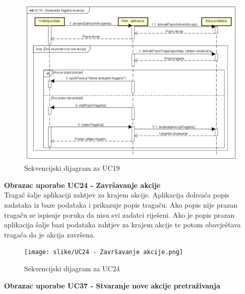				\begin{figure}[H]
					\includegraphics[scale=0.5]{slike/UC19 - Dodavanje tragača na akciju.png} %
					\centering
					\caption{Sekvencijski dijagram za UC19}
					\label{fig:UC19 - Dodavanje tragača na akciju}
				\end{figure}
	
				\eject

				\noindent
				\textbf{Obrazac uporabe UC24 - Završavanje akcije}\\

				\noindent
				Tragač šalje aplikaciji zahtjev za krajem akcije.
        				Aplikacija dohvaća popis zadataka iz baze podataka i prikazuje popis tragaču.
        				Ako popis nije prazan tragaču se ispisuje poruka da nisu svi zadatci riješeni.
				        Ako je popis prazan aplikacija šalje bazi podataka zahtjev za krajem akcije
        				te potom obavještava tragača da je akcija završena.

				

				\begin{figure}[H]
					\texttt{[image: slike/UC24 - Završavanje akcije.png]} %
					\centering
					\caption{Sekvencijski dijagram za UC24}
					\label{fig:UC24 - Završavanje akcije}
				\end{figure}

				\eject

				\noindent
				\textbf{Obrazac uporabe UC37 - Stvaranje nove akcije pretraživanja}\\

